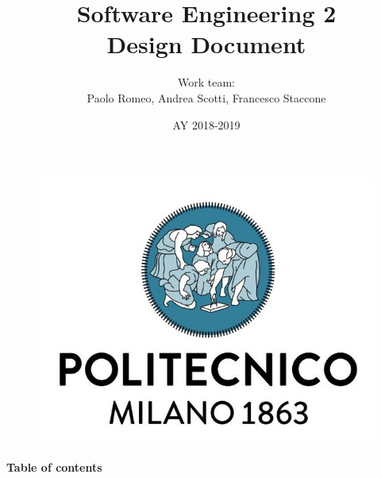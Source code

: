 \documentclass{article}
\begin{document}
	
	\begin{figure}
  	\includegraphics[width=\linewidth]{../images/Logo-PoliMi.jpg}
	\end{figure}
	\title{\textbf{Software Engineering 2\\Design Document}}
	\author{Work team:\\Paolo Romeo, Andrea Scotti, Francesco Staccone}
	\date{AY 2018-2019}
	\maketitle{}

	\newpage
	
	\textbf{Table of contents}
\end{document}
